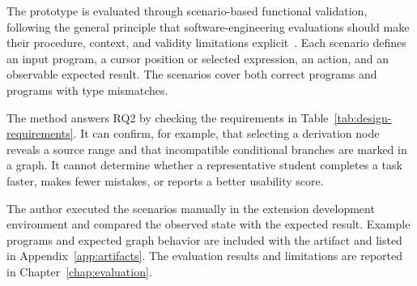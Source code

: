 The prototype is evaluated through scenario-based functional validation, following the general principle that software-engineering evaluations should make their procedure, context, and validity limitations explicit~\cite{Wohlin2012Experimentation,RunesonHost2009}. Each scenario defines an input program, a cursor position or selected expression, an action, and an observable expected result. The scenarios cover both correct programs and programs with type mismatches.

The method answers RQ2 by checking the requirements in Table~\ref{tab:design-requirements}. It can confirm, for example, that selecting a derivation node reveals a source range and that incompatible conditional branches are marked in a graph. It cannot determine whether a representative student completes a task faster, makes fewer mistakes, or reports a better usability score.

The author executed the scenarios manually in the extension development environment and compared the observed state with the expected result. Example programs and expected graph behavior are included with the artifact and listed in Appendix~\ref{app:artifacts}. The evaluation results and limitations are reported in Chapter~\ref{chap:evaluation}.

